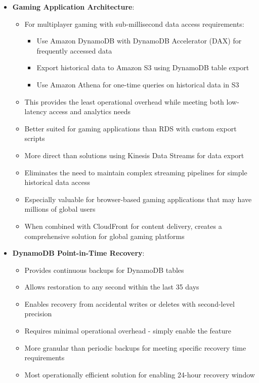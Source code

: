 \documentclass[11pt,a4paper]{report}
\begin{document}
\begin{itemize}
\begin{itemize}
  \item Provides a continuous backup capability with transaction logs for fine-grained recovery points
\end{itemize}
  \item \textbf{Gaming Application Architecture}:
\begin{itemize}
  \item For multiplayer gaming with sub-millisecond data access requirements:
\begin{itemize}
  \item Use Amazon DynamoDB with DynamoDB Accelerator (DAX) for frequently accessed data
  \item Export historical data to Amazon S3 using DynamoDB table export
  \item Use Amazon Athena for one-time queries on historical data in S3
\end{itemize}
  \item This provides the least operational overhead while meeting both low-latency access and analytics needs
  \item Better suited for gaming applications than RDS with custom export scripts
  \item More direct than solutions using Kinesis Data Streams for data export
  \item Eliminates the need to maintain complex streaming pipelines for simple historical data access
  \item Especially valuable for browser-based gaming applications that may have millions of global users
  \item When combined with CloudFront for content delivery, creates a comprehensive solution for global gaming platforms
\end{itemize}
  \item \textbf{DynamoDB Point-in-Time Recovery}:
\begin{itemize}
  \item Provides continuous backups for DynamoDB tables
  \item Allows restoration to any second within the last 35 days
  \item Enables recovery from accidental writes or deletes with second-level precision
  \item Requires minimal operational overhead - simply enable the feature
  \item More granular than periodic backups for meeting specific recovery time requirements
  \item Most operationally efficient solution for enabling 24-hour recovery window

\end{itemize}
\end{itemize}
\end{document}
